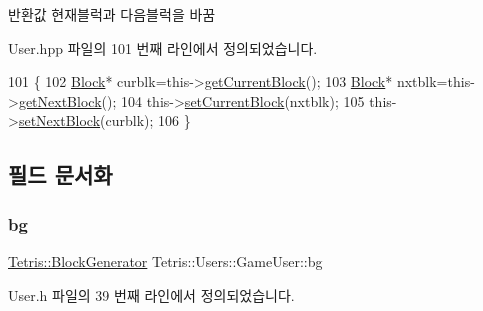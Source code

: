 \begin{DoxyReturn}{반환값}
현재블럭과 다음블럭을 바꿈 
\end{DoxyReturn}


User.\+hpp 파일의 101 번째 라인에서 정의되었습니다.


\begin{DoxyCode}
101                                   \{
102                     \hyperlink{class_tetris_1_1_block}{Block}* curblk=this->\hyperlink{class_tetris_1_1_users_1_1_game_user_a3d4bcc74d518c28356012f8a42b85896}{getCurrentBlock}();
103                     \hyperlink{class_tetris_1_1_block}{Block}* nxtblk=this->\hyperlink{class_tetris_1_1_users_1_1_game_user_a9300608a38f8a3b10f9d6b6bdaeaab18}{getNextBlock}();
104                     this->\hyperlink{class_tetris_1_1_users_1_1_game_user_ae1743f8024d25ed74d7b2e456907ee41}{setCurrentBlock}(nxtblk);
105                     this->\hyperlink{class_tetris_1_1_users_1_1_game_user_a6249d0f4e9d77edd94935a74bbd298d5}{setNextBlock}(curblk);
106                 \}
\end{DoxyCode}


\subsection{필드 문서화}
\mbox{\label{class_tetris_1_1_users_1_1_game_user_ad57a39d1716322764d92ff76f08ebcd5}} 
\subsubsection{\texorpdfstring{bg}{bg}}
{\footnotesize\ttfamily \hyperlink{class_tetris_1_1_block_generator}{Tetris\+::\+Block\+Generator} Tetris\+::\+Users\+::\+Game\+User\+::bg\hspace{0.3cm}{\ttfamily [private]}}



User.\+h 파일의 39 번째 라인에서 정의되었습니다.

\mbox{\label{class_tetris_1_1_users_1_1_game_user_a49692727d4018181845500b0ee765296}} 
